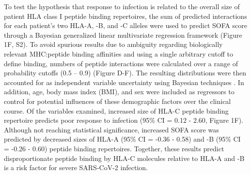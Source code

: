 \documentclass[utf8]{frontiersinFPHY_FAMS} %
\begin{document}
To test the hypothesis that response to infection is related to the overall size of patient HLA class I peptide binding repertoires, the sum of predicted interactions for each patient’s two HLA-A, -B, and -C alleles were used to predict SOFA score through a Bayesian generalized linear multivariate regression framework (Figure 1F, S2). To avoid spurious results due to ambiguity regarding biologically relevant MHC:peptide binding affinities and using a single arbitrary cutoff to define binding, numbers of peptide interactions were calculated over a range of probability cutoffs (0.5 – 0.9) (Figure D-F). The resulting distributions were then accounted for as independent variable uncertainty using Bayesian techniques \citep{RJ-2018-017, Carpenter2017}. In addition, age, body mass index (BMI), and sex were included as regressors to control for potential influences of these demographic factors over the clinical course. Of the variables examined, increased size of HLA-C peptide binding repertoire predicts poor response to infection (95\% CI = 0.12 - 2.60, Figure 1F). Although not reaching statistical significance, increased SOFA score was predicted by decreased sizes of HLA-A (95\% CI = -0.36 - 0.58) and -B (95\% CI = -0.26 - 0.60) peptide binding repertoires. Together, these results predict disproportionate peptide binding by HLA-C molecules relative to HLA-A and -B is a risk factor for severe SARS-CoV-2 infection.
\end{document}
